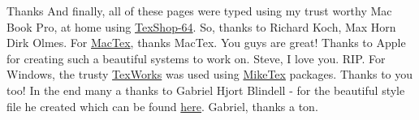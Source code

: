 \begin{subsection}{Thanks}
And finally, all of these pages were typed using my trust worthy Mac Book Pro, at home using \href{http://pages.uoregon.edu/koch/texshop}{TexShop-64}.
So, thanks to Richard Koch, Max Horn Dirk Olmes. For \href{http://tug.org/mactex/}{MacTex}, thanks MacTex. You guys are great!
Thanks to Apple for creating such a beautiful systems to work on. Steve, I love you. RIP.
For Windows, the trusty \href{http://www.tug.org/texworks}{TexWorks} was used using \href{http://miktex.org}{MikeTex} packages. Thanks to you too!
In the end many a thanks to Gabriel Hjort Blindell - for the beautiful style file he created which can be found 
\href{http://gabriel.hjort.blindell.se/publications/documents/thesis-template.tar.gz}{here}. Gabriel, thanks a ton.
\end{subsection}
